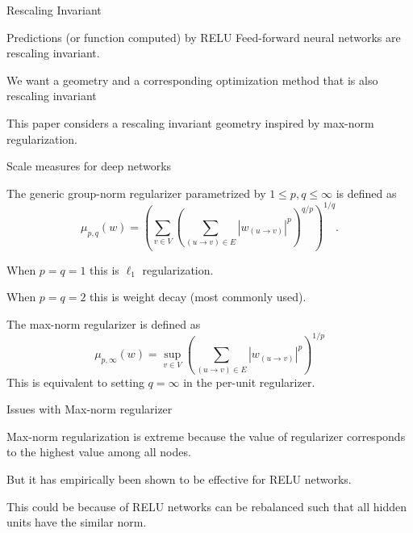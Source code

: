 \documentclass[presentation,xcolor={usenames,dvipsnames},10pt]{beamer}
\begin{document}
\begin{frame}{Rescaling Invariant}

\bit 
\item Predictions (or function computed) by RELU Feed-forward neural networks are rescaling invariant.
\item We want a geometry and a corresponding optimization method that is also rescaling invariant 

\item This paper considers a rescaling invariant geometry inspired by max-norm regularization.

\eit 

\end{frame}


\begin{frame}{Scale measures for deep networks}
\begin{definition}
The generic group-norm regularizer
parametrized by $1\leq p,q \leq\infty$ is defined as
\begin{equation*}
\label{eq:mu}
\mu_{p,q}(w) = \left(\sum_{v \in V}\left(\sum_{(u\rightarrow v) \in E} \left\lvert w_{(u\rightarrow v)}\right\rvert ^p\right)^{q/p}\right)^{1/q}.
\end{equation*} 
\end{definition}

\bit
\item When $p=q=1$ this is $\ell_1$ regularization. 
\item When $p=q=2$ this is weight decay (most commonly used). 
\eit 

\begin{definition}
The max-norm regularizer is defined as 
\begin{equation*}
\mu_{p,\infty}(w) =\sup_{v \in V}\left(\sum_{(u\rightarrow v) \in E} \left\lvert w_{(u\rightarrow v)}\right\rvert ^p\right)^{1/p}
\end{equation*}
This is equivalent to setting $q=\infty$ in the per-unit regularizer. 
\end{definition}
\end{frame}

\begin{frame}{Issues with Max-norm regularizer}

\bit
\item Max-norm regularization is
extreme because the value of regularizer corresponds to
the highest value among all nodes.

\item But it has empirically been shown to be effective for RELU networks. 

\item This could be because of RELU networks can be rebalanced such that all hidden units have the similar norm. 

\eit 
\end{frame} 
\end{document}
